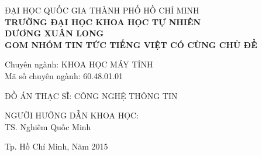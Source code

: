 \vspace{-0.75cm}
\begin{center}
\begingroup \fontsize{14pt}{0pt}\selectfont ĐẠI HỌC QUỐC GIA THÀNH PHỐ HỒ CHÍ MINH\endgroup\\
\textbf{\begingroup \fontsize{14pt}{21pt}\selectfont TRƯỜNG ĐẠI HỌC KHOA HỌC TỰ NHIÊN \endgroup}\\
\vspace{2.25cm}
\textbf{\begingroup \fontsize{14pt}{21pt}\selectfont DƯƠNG XUÂN LONG\endgroup}\\
\vspace{2.5cm}
\renewcommand{\baselinestretch}{1.0}%
\textbf{\begingroup \fontsize{16pt}{24pt}\selectfont GOM NHÓM TIN TỨC TIẾNG VIỆT CÓ CÙNG CHỦ ĐỀ\endgroup}\\
\renewcommand{\baselinestretch}{\spacing}%
\end{center}
\vspace{2.25cm}

\begingroup
Chuyên ngành: KHOA HỌC MÁY TÍNH\\
\forceindent Mã số chuyên ngành: 60.48.01.01\\
\vspace{0.5cm}
\endgroup

ĐỒ ÁN THẠC SĨ: CÔNG NGHỆ THÔNG TIN\\
\vspace{0.75cm}

\begin{center}
NGƯỜI HƯỚNG DẪN KHOA HỌC:\\
TS. Nghiêm Quốc Minh
\end{center}
\vspace{\fill}

\begin{center}
Tp. Hồ Chí Minh, Năm 2015
\end{center}
\newpage